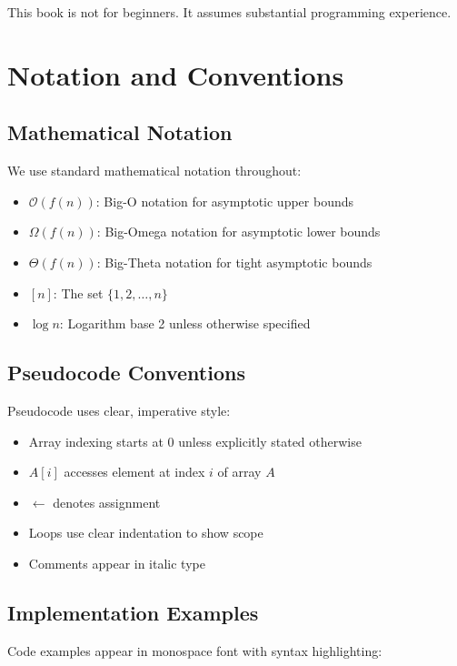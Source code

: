This book is not for beginners. It assumes substantial programming experience.

\section*{Notation and Conventions}

\subsection*{Mathematical Notation}

We use standard mathematical notation throughout:

\begin{itemize}
    \item $\mathcal{O}(f(n))$: Big-O notation for asymptotic upper bounds
    \item $\Omega(f(n))$: Big-Omega notation for asymptotic lower bounds
    \item $\Theta(f(n))$: Big-Theta notation for tight asymptotic bounds
    \item $[n]$: The set $\{1, 2, \ldots, n\}$
    \item $\log n$: Logarithm base 2 unless otherwise specified
\end{itemize}

\subsection*{Pseudocode Conventions}

Pseudocode uses clear, imperative style:

\begin{itemize}
    \item Array indexing starts at 0 unless explicitly stated otherwise
    \item $A[i]$ accesses element at index $i$ of array $A$
    \item $\gets$ denotes assignment
    \item Loops use clear indentation to show scope
    \item Comments appear in italic type
\end{itemize}

\subsection*{Implementation Examples}

Code examples appear in monospace font with syntax highlighting:

